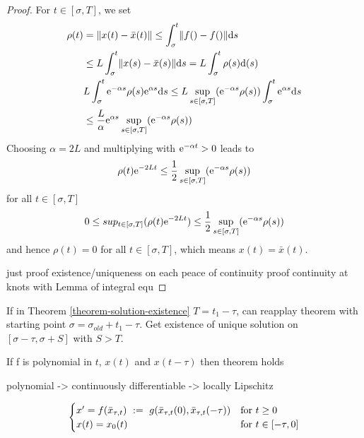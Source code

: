 \documentclass[10pt]{article}
\begin{document}
\begin{proof}
    For $t\in [\sigma,T]$, we set
    \begin{align*}
        \rho(t) &= \lVert x(t)-\bar{x}(t)\rVert \leq \int_\sigma^t \lVert f()-f()\rVert\text{d}s\\
        & \leq L \int_\sigma^t \lVert x(s)-\bar{x}(s)\rVert\text{d}s = L \int_\sigma^t \rho(s)\text{d}(s)\\
        & L \int_\sigma^t \text{e}^{-\alpha s}\rho(s)\text{e}^{\alpha s}\text{d}s \leq L \sup_{s\in [\sigma,T]}(\text{e}^{-\alpha s}\rho(s))\int_\sigma^t \text{e}^{\alpha s}\text{d}s\\
        & \leq\frac{L}{\alpha}\text{e}^{\alpha s} \sup_{s\in [\sigma,T]}(\text{e}^{-\alpha s}\rho(s))
    \end{align*}
    Choosing $\alpha=2L$ and multiplying with $\text{e}^{-\alpha t}>0$ leads to
    \begin{equation}
        \rho(t)\text{e}^{-2Lt} \leq \frac{1}{2}\sup_{s\in [\sigma,T]}(\text{e}^{-\alpha s}\rho(s))
    \end{equation}
    for all $t\in [\sigma,T]$
    \begin{equation}
        0 \leq sup_{t\in [\sigma,T]}(\rho(t)\text{e}^{-2Lt}) \leq \frac{1}{2}\sup_{s\in [\sigma,T]}(\text{e}^{-\alpha s}\rho(s))
    \end{equation}
    and hence $\rho(t)=0$ for all $t\in [\sigma,T]$, which means $x(t)=\bar{x}(t)$.

    just proof existence/uniqueness on each peace of continuity proof continuity at knots with Lemma of integral equ

\end{proof}

\begin{corollary}
    \label{cor:continuability-of-solution}
    If in Theorem \ref{theorem-solution-existence} $T=t_1-\tau$, can reapplay theorem with starting point $\sigma=\sigma_{old}+t_1-\tau$. Get existence of unique solution on $[\sigma-\tau,\sigma+S]$ with $S>T$.
\end{corollary}

\begin{corollary}
    \label{corollary}
    If f is polynomial in $t$, $x(t)$ and $x(t-\tau)$ then theorem holds

    polynomial -> continuously differentiable -> locally Lipschitz


\begin{equation}
    \begin{cases}
        x'=f(\bar{x}_{\tau,t})~\mathrel{\mathop{:}}=~ g(\bar{x}_{\tau,t}(0),\bar{x}_{\tau,t}(-\tau)) &\text{for } t\geq 0\\
        x(t)=x_0(t) & \text{for } t\in[-\tau,0]
    \end{cases}
\end{equation}
\end{corollary}
\end{document}
